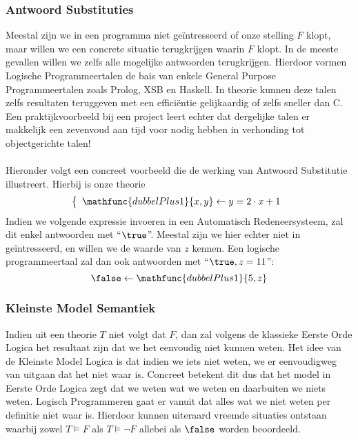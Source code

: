 \subsubsection{Antwoord Substituties}
Meestal zijn we in een programma niet ge\"intresseerd of onze stelling $F$ klopt, maar willen we een concrete situatie terugkrijgen waarin $F$ klopt. In de meeste gevallen willen we zelfs alle mogelijke antwoorden terugkrijgen. Hierdoor vormen Logische Programmeertalen de bais van enkele General Purpose Programmeertalen zoals Prolog, XSB en Haskell. In theorie kunnen deze talen zelfs resultaten teruggeven met een effici\"entie gelijkaardig of zelfs sneller dan C. Een praktijkvoorbeeld bij een project leert echter dat dergelijke talen er makkelijk een zevenvoud aan tijd voor nodig hebben in verhouding tot objectgerichte talen!
\paragraph{}Hieronder volgt een concreet voorbeeld die de werking van Antwoord Substitutie illustreert. Hierbij is onze theorie
\begin{equation}
\left\{\begin{array}{l}
\mathfunc{dubbelPlus1}{x,y}\leftarrow y=2\cdot x+1
\end{array}\right.
\end{equation}
Indien we volgende expressie invoeren in een Automatisch Redeneersysteem, zal dit enkel antwoorden met ``$\true$''. Meestal zijn we hier echter niet in ge\"intresseerd, en willen we de waarde van $z$ kennen. Een logische programmeertaal zal dan ook antwoorden met ``$\true, z=11$'':
\begin{equation}
\false\leftarrow\mathfunc{dubbelPlus1}{5,z}
\end{equation}
\subsubsection{Kleinste Model Semantiek}
Indien uit een theorie $T$ niet volgt dat $F$, dan zal volgens de klassieke Eerste Orde Logica het resultaat zijn dat we het eenvoudig niet kunnen weten. Het idee van de Kleinste Model Logica is dat indien we iets niet weten, we er eenvoudigweg van uitgaan dat het niet waar is. Concreet betekent dit dus dat het model in Eerste Orde Logica zegt dat we weten wat we weten en daarbuiten we niets weten. Logisch Programmeren gaat er vanuit dat alles wat we niet weten per definitie niet waar is. Hierdoor kunnen uiteraard vreemde situaties ontstaan waarbij zowel $T\vDash F$ als $T\vDash\neg F$ allebei als $\false$ worden beoordeeld.

